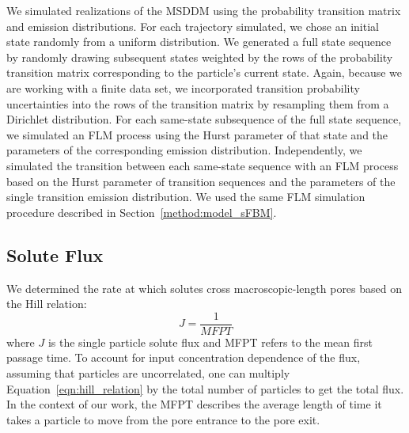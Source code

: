 \documentclass{article}
\begin{document}
  
  We simulated realizations of the MSDDM using the probability transition matrix and 
  emission distributions. For each trajectory simulated, we chose an initial state
  randomly from a uniform distribution. We generated a full state sequence by randomly
  drawing subsequent states weighted by the rows of the probability transition matrix
  corresponding to the particle's current state. Again, because we are working with a
  finite data set, we incorporated transition probability uncertainties into the rows
  of the transition matrix by resampling them from a Dirichlet distribution. For each 
  same-state subsequence of the full state sequence, we simulated an FLM process using
  the Hurst parameter of that state and the parameters of the corresponding emission
  distribution. Independently, we simulated the transition between each same-state 
  sequence with an FLM process based on the Hurst parameter of transition sequences 
  and the parameters of the single transition emission distribution. We used the same
  FLM simulation procedure described in Section~\ref{method:model_sFBM}.


  \subsection{Solute Flux}\label{method:mfpt}
  
  We determined the rate at which solutes cross macroscopic-length pores based on the
  Hill relation:~\cite{hill_free_1989}
  \begin{equation}
  J = \frac{1}{MFPT}
  \label{eqn:hill_relation}
  \end{equation}
  where $J$ is the single particle solute flux and MFPT refers to the mean first passage
  time. To account for input concentration dependence of the flux, assuming that particles
  are uncorrelated, one can multiply Equation~\ref{eqn:hill_relation} by the total number
  of particles to get the total flux. In the context of our work, the MFPT describes the
  average length of time it takes a particle to move from the pore entrance to the pore exit. 
  
\end{document}
